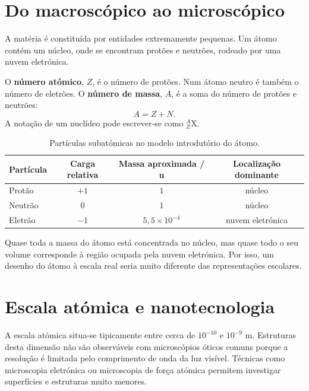 \documentclass[11pt,a4paper,oneside]{book}
\begin{document}
\section{Do macroscópico ao microscópico}
A matéria é constituída por entidades extremamente pequenas. Um átomo contém um núcleo, onde se encontram protões e neutrões, rodeado por uma nuvem eletrónica.

\begin{center}
\end{center}

O \textbf{número atómico}, $Z$, é o número de protões. Num átomo neutro é também o número de eletrões. O \textbf{número de massa}, $A$, é a soma do número de protões e neutrões:
\[
A=Z+N.
\]
A notação de um nuclídeo pode escrever-se como $^{A}_{Z}\mathrm{X}$.

\begin{table}[H]
\centering
\caption{Partículas subatómicas no modelo introdutório do átomo.}
\begin{tabular}{lccc}
\toprule
Partícula & Carga relativa & Massa aproximada / u & Localização dominante \\
\midrule
Protão & $+1$ & $1$ & núcleo \\
Neutrão & $0$ & $1$ & núcleo \\
Eletrão & $-1$ & $5{,}5\times10^{-4}$ & nuvem eletrónica \\
\bottomrule
\end{tabular}
\end{table}

\begin{conceito}
Quase toda a massa do átomo está concentrada no núcleo, mas quase todo o seu volume corresponde à região ocupada pela nuvem eletrónica. Por isso, um desenho do átomo à escala real seria muito diferente das representações escolares.
\end{conceito}

\section{Escala atómica e nanotecnologia}
A escala atómica situa-se tipicamente entre cerca de $10^{-10}$ e $10^{-9}$ m. Estruturas desta dimensão não são observáveis com microscópios óticos comuns porque a resolução é limitada pelo comprimento de onda da luz visível. Técnicas como microscopia eletrónica ou microscopia de força atómica permitem investigar superfícies e estruturas muito menores.
\end{document}
